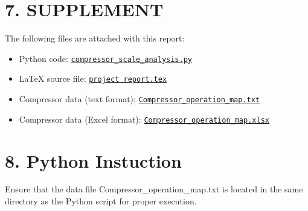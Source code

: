 \documentclass[12pt]{article}
\begin{document}
\section*{\large{7. SUPPLEMENT}}
The following files are attached with this report:
\begin{itemize}
    \item Python code: \href{https://github.com/Navnit1294/ME_302_Course_Project/edit/main/compressor_map.py#L23C0}{\texttt{compressor\_scale\_analysis.py}}
    \item LaTeX source file: \href{https://github.com/Navnit1294/ME_302_Course_Project/blob/main/ME_302_Course_Project.tex}{\texttt{project report.tex}}
    \item Compressor data (text format): \href{https://github.com/Navnit1294/ME_302_Course_Project/blob/main/Compressor_operation_map.txt}{\texttt{Compressor\_operation\_map.txt}}
    \item Compressor data (Excel format): \href{https://github.com/Navnit1294/ME_302_Course_Project/blob/main/Compressor_operation_map.xlsx}{\texttt{Compressor\_operation\_map.xlsx}}
\end{itemize}
\section*{\large{8. Python Instuction}}
Ensure that the data file Compressor\_operation\_map.txt is located in the same
directory as the Python script for proper execution.
\end{document}
